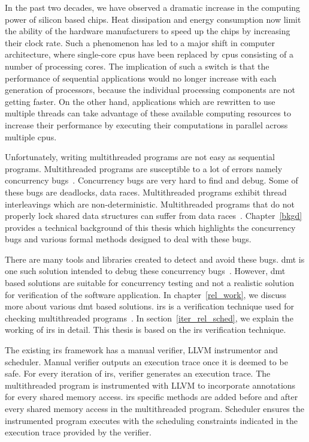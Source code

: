 In the past two decades, we have observed a dramatic increase in the computing power of silicon based chips. 
Heat dissipation and energy consumption now limit the ability of the hardware manufacturers to speed up the chips by increasing their clock rate. 
Such a phenomenon has led to a major shift in computer architecture, where single-core \acrshort{cpu}s have been replaced by \acrshort{cpu}s consisting of a number of processing cores. 
The implication of such a switch is that the performance of sequential applications would no longer increase with each generation of processors, because the individual processing components are not getting faster. 
On the other hand, applications which are rewritten to use multiple threads can take advantage of these available computing resources to increase their performance by executing their computations in parallel across multiple \acrshort{cpu}s. 

Unfortunately, writing multithreaded programs are not easy as sequential programs. 
Multithreaded programs are susceptible to a lot of errors namely concurrency bugs~\citep{carver2005modern}. 
Concurrency bugs are very hard to find and debug. 
Some of these bugs are deadlocks, data races. 
Multithreaded programs exhibit thread interleavings which are non-deterministic. 
Multithreaded programs that do not properly lock shared data structures can suffer from data races~\citep{netzer1992race}. 
Chapter~\ref{bkgd} provides a technical background of this thesis which highlights the concurrency bugs and various formal methods designed to deal with these bugs.

There are many tools and libraries created to detect and avoid these bugs. 
\acrfull{dmt} is one such solution intended to debug these concurrency bugs~\citep{dthreads}. 
However, \acrshort{dmt} based solutions are suitable for concurrency testing and not a realistic solution for verification of the software application. 
In chapter~\ref{rel_work}, we discuss more about various \acrshort{dmt} based solutions.  
\acrfull{irs} is a verification technique used for checking multithreaded programs~\citep{metzler2017quick}. 
In section~\ref{iter_rel_sched}, we explain the working of \acrshort{irs} in detail. 
This thesis is based on the \acrshort{irs} verification technique. 

The existing \acrshort{irs} framework has a manual verifier, LLVM instrumentor and scheduler. 
Manual verifier outputs an execution trace once it is deemed to be safe. 
For every iteration of \acrshort{irs}, verifier generates an execution trace. 
The multithreaded program is instrumented with LLVM to incorporate annotations for every shared memory access. 
\acrshort{irs} specific methods are added before and after every shared memory access in the multithreaded program. 
Scheduler ensures the instrumented program executes with the scheduling constraints indicated in the execution trace provided by the verifier. 

